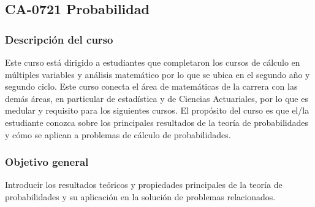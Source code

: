 \newpage
\subsection*{CA-0721 Probabilidad}

\hypertarget{CA0721}{}
\begin{refsection}
\begin{table}[H]
\end{table}

\subsubsection*{Descripción del curso}

Este curso está dirigido a estudiantes que completaron los cursos de cálculo en múltiples variables y análisis matemático por lo que se ubica en el segundo año y segundo ciclo. Este curso conecta el área de matemáticas de la carrera con las demás áreas, en particular de estadística y de Ciencias Actuariales, por lo que es medular y requisito para los siguientes cursos. El propósito del curso es que el/la estudiante conozca sobre los principales resultados de la teoría de probabilidades y cómo se aplican a problemas de cálculo de probabilidades.

\subsubsection*{Objetivo general}

Introducir los resultados teóricos y propiedades principales de la teoría de probabilidades y su aplicación en la solución de problemas relacionados.


\end{refsection}
